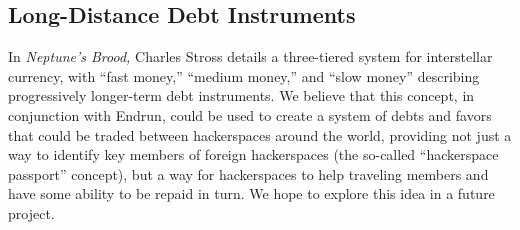 \documentclass[12pt]{article}
\begin{document}
  \subsection{Long-Distance Debt Instruments}
  
  In \emph{Neptune's Brood,} Charles Stross details a three-tiered system for interstellar currency, with ``fast money,'' ``medium money,'' and ``slow money'' describing progressively longer-term debt instruments. We believe that this concept, in conjunction with Endrun, could be used to create a system of debts and favors that could be traded between hackerspaces around the world, providing not just a way to identify key members of foreign hackerspaces (the so-called ``hackerspace passport'' concept), but a way for hackerspaces to help traveling members and have some ability to be repaid in turn. We hope to explore this idea in a future project.
\end{document}
